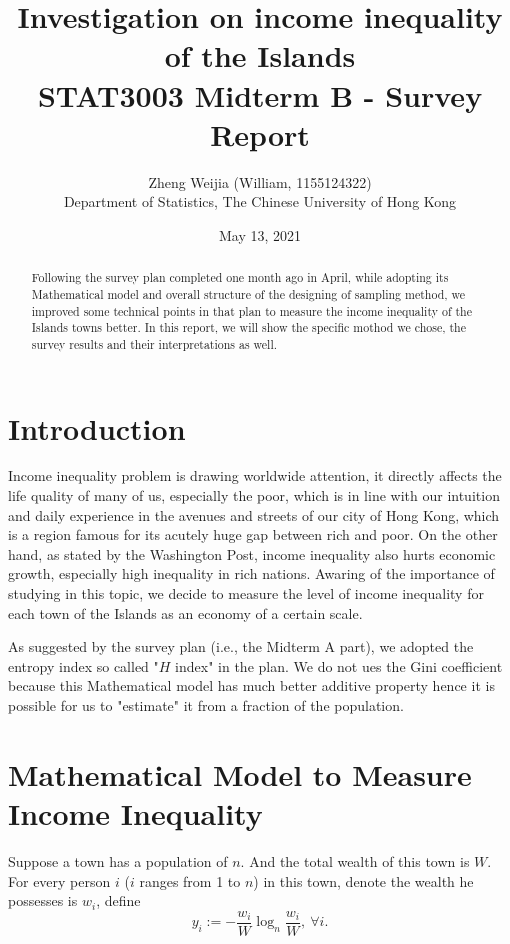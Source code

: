 \documentclass[12pt]{article}%
\begin{document}
\large

\title{Investigation on income inequality of the Islands\\
\Large STAT3003 Midterm B - Survey Report}
\author{Zheng Weijia (William, 1155124322) \\
Department of Statistics,
The Chinese University of Hong Kong}
\date{May 13, 2021}
\maketitle

\begin{abstract}
    Following the survey plan completed one month ago in April, 
    while adopting its Mathematical model and 
    overall structure of the designing of sampling method, 
    we improved some technical points in that plan 
    to measure the income inequality of the Islands towns better. 
    In this report, we will show the specific mothod we chose, 
    the survey results and their interpretations as well.

\end{abstract}

\section{Introduction}
Income inequality problem is drawing worldwide attention, 
it directly affects the life quality of many of us, especially the poor, 
which is in line with our intuition and daily experience 
in the avenues and streets of our city of Hong Kong, 
which is a region famous for its acutely huge gap between rich and poor.
On the other hand, as stated by the Washington Post, income inequality also
hurts economic growth, especially high inequality in rich nations. 
Awaring of the importance of studying in this topic,
we decide to measure the level of income inequality 
for each town of the Islands as an economy of a certain scale. 

As suggested by the survey plan (i.e., the Midterm A part), 
we adopted the entropy index so called "$H$ index" in the plan. 
We do not ues the Gini coefficient because 
this Mathematical model has much better additive property hence 
it is possible for us to "estimate" it from a fraction of the population.


\section{Mathematical Model to Measure Income Inequality}
Suppose a town has a population of $n$. 
And the total wealth of this town is $W$. 
For every person $i$ ($i$ ranges from 1 to $n$) in this town, 
denote the wealth he possesses is $w_i$, define 
$$y_i := -\frac{w_i}{W}\log_{n}{ \frac{w_i}{W} } ,~ \forall i.$$
\end{document}
